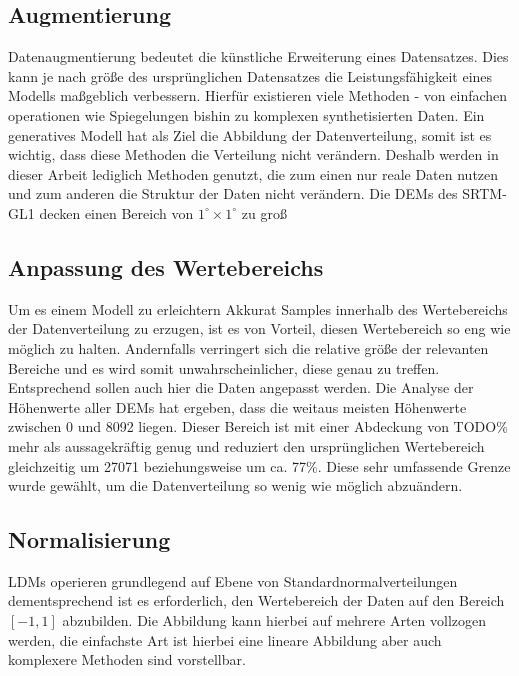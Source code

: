 \subsection{Augmentierung}
\label{subsec:Augmentierung}

Datenaugmentierung bedeutet die künstliche Erweiterung eines Datensatzes. Dies kann je nach größe des ursprünglichen Datensatzes die Leistungsfähigkeit eines Modells maßgeblich verbessern. Hierfür existieren viele Methoden - von einfachen operationen wie Spiegelungen bishin zu komplexen synthetisierten Daten. Ein generatives Modell hat als Ziel die Abbildung der Datenverteilung, somit ist es wichtig, dass diese Methoden die Verteilung nicht verändern. Deshalb werden in dieser Arbeit lediglich Methoden genutzt, die zum einen nur reale Daten nutzen und zum anderen die Struktur der Daten nicht verändern.
Die DEMs des SRTM-GL1 decken einen Bereich von $1^{\circ}\times1^{\circ}$ zu groß


\subsection{Anpassung des Wertebereichs}

Um es einem Modell zu erleichtern Akkurat Samples innerhalb des Wertebereichs der Datenverteilung zu erzugen, ist es von Vorteil, diesen Wertebereich so eng wie möglich zu halten. Andernfalls verringert sich die relative größe der relevanten Bereiche und es wird somit unwahrscheinlicher, diese genau zu treffen. Entsprechend sollen auch hier die Daten angepasst werden. 
Die Analyse der Höhenwerte aller DEMs hat ergeben, dass die weitaus meisten Höhenwerte zwischen 0 und 8092 liegen. Dieser Bereich ist mit einer Abdeckung von TODO\% mehr als aussagekräftig genug und reduziert den ursprünglichen Wertebereich gleichzeitig um 27071 beziehungsweise um ca. 77\%. 
Diese sehr umfassende Grenze wurde gewählt, um die Datenverteilung so wenig wie möglich abzuändern. 

\subsection{Normalisierung}

LDMs operieren grundlegend auf Ebene von Standardnormalverteilungen dementsprechend ist es erforderlich, den Wertebereich der Daten auf den Bereich $\left [ -1, 1\right ]$ abzubilden. Die Abbildung kann hierbei auf mehrere Arten vollzogen werden, die einfachste Art ist hierbei eine lineare Abbildung aber auch komplexere Methoden sind vorstellbar. 

